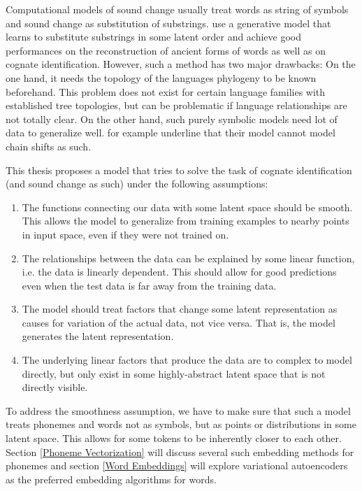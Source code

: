 \documentclass[6pt]{article}
\begin{document}
Computational models of sound change usually treat words as string of symbols and sound change as substitution of substrings.\cite{bouchard2007probabilistic,bouchard2013automated} use a generative model that learns to substitute substrings in some latent order and achieve good performances on the reconstruction of ancient forms of words as well as on cognate identification. However, such a method has two major drawbacks: On the one hand, it needs the topology of the languages phylogeny to be known beforehand. This problem does not exist for certain language families with established tree topologies, but can be problematic if language relationships are not totally clear. On the other hand, such purely symbolic models need lot of data to generalize well. \cite{bouchard2007probabilistic} for example underline that their model cannot model chain shifts as such.

This thesis proposes a model that tries to solve the task of cognate identification (and sound change as such) under the following assumptions:
\begin{enumerate}
\item The functions connecting our data with some latent space should be smooth. This allows the model to generalize from training examples to nearby points in input space, even if they were not trained on. 
\item The relationships between the data can be explained by some linear function, i.e. the data is linearly dependent. This should allow for good predictions even when the test data is far away from the training data. 
\item The model should treat factors that change some latent representation as causes for variation of the actual data, not vice versa. That is, the model generates the latent representation.
\item The underlying linear factors that produce the data are to complex to model directly, but only exist in some highly-abstract latent space that is not directly visible. 
\end{enumerate}

To address the smoothness assumption, we have to make sure that such a model treats phonemes and words not as symbols, but as points or distributions in some latent space. This allows for some tokens to be inherently closer to each other. Section \ref{Phoneme Vectorization} will discuss several such embedding methods for phonemes and section \ref{Word Embeddings} will explore variational autoencoders as the preferred embedding algorithms for words.  
\end{document}
